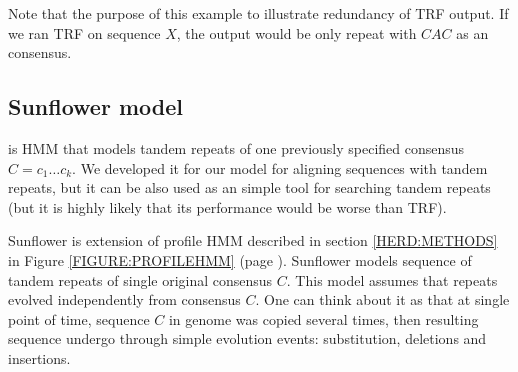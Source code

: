 Note that the purpose of this example to illustrate redundancy of TRF output.
If we ran TRF on sequence $X$, the output would be only repeat with $CAC$ as an
consensus.

\subsection{Sunflower model}
 is HMM that models tandem repeats of one
previously specified consensus $C=c_1\dots c_k$. We developed it for our model
for aligning sequences with tandem repeats, but it can be also used as an
simple tool for searching tandem repeats (but it is highly likely that its
performance would be worse than TRF).

Sunflower is extension of profile HMM described in section \ref{HERD:METHODS}
in Figure \ref{FIGURE:PROFILEHMM} (page \pageref{FIGURE:PROFILEHMM}). Sunflower
models sequence of tandem repeats of single original consensus $C$. This model
assumes that repeats evolved independently from consensus $C$. One can think
about it as that at single point of time, sequence $C$ in genome was copied
several times, then resulting sequence undergo through simple evolution events:
substitution, deletions and insertions.

